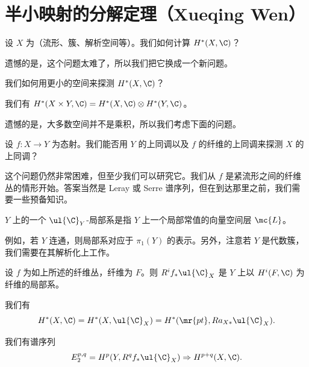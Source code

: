 \section{半小映射的分解定理（Xueqing Wen）}%
\label{sec:Decomposition theorem for semi-small maps (Xueqing Wen)}

\begin{quest}
    设 \(X\) 为（流形、簇、解析空间等）。我们如何计算 \(H^*(X, \C)\)？
\end{quest}

遗憾的是，这个问题太难了，所以我们把它换成一个新问题。

\begin{quest}
    我们如何用更小的空间来探测 \(H^*(X, \C)\)？
\end{quest}

\begin{thm}[K\"unneth 公式]
    我们有 \(H^*(X \times Y, \C) = H^*(X, \C) \otimes H^*(Y, \C)\)。
\end{thm}

遗憾的是，大多数空间并不是乘积，所以我们考虑下面的问题。

\begin{quest}
    设 \(f \colon X \to Y\) 为态射。我们能否用 \(Y\) 的上同调以及 \(f\) 的纤维的上同调来探测 \(X\) 的上同调？
\end{quest}

这个问题仍然非常困难，但至少我们可以研究它。我们从 \(f\) 是紧流形之间的纤维丛的情形开始。答案当然是 Leray 或 Serre 谱序列，但在到达那里之前，我们需要一些预备知识。

\begin{defn}
    \(Y\) 上的一个 \(\ul{\C}_Y\)-局部系是指 \(Y\) 上一个局部常值的向量空间层 \(\mc{L}\)。
\end{defn}

例如，若 \(Y\) 连通，则局部系对应于 \(\pi_1(Y)\) 的表示。另外，注意若 \(Y\) 是代数簇，我们需要在其解析化上工作。

\begin{exm}
    设 \(f\) 为如上所述的纤维丛，纤维为 \(F\)。则 \(R^i f_* \ul{\C}_X\) 是 \(Y\) 上以 \(H^i(F, \C)\) 为纤维的局部系。
\end{exm}

\begin{prop}
    我们有
    \[ H^*(X, \C) = H^*(X, \ul{\C}_X) = H^*(\mr{pt}, R a_{X*} \ul{\C}_X). \]
\end{prop}

\begin{thm}
    我们有谱序列
    \[ E_2^{p,q} = H^p(Y, R^q f_* \ul{\C}_X) \Rightarrow H^{p+q}(X, \C). \]
\end{thm}

